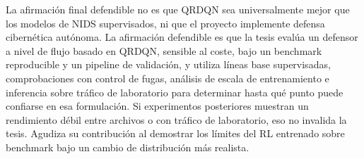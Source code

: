 La afirmación final defendible no es que QRDQN sea universalmente mejor que los modelos de NIDS supervisados, ni que el proyecto implemente defensa cibernética autónoma. La afirmación defendible es que la tesis evalúa un defensor a nivel de flujo basado en QRDQN, sensible al coste, bajo un benchmark reproducible y un pipeline de validación, y utiliza líneas base supervisadas, comprobaciones con control de fugas, análisis de escala de entrenamiento e inferencia sobre tráfico de laboratorio para determinar hasta qué punto puede confiarse en esa formulación. Si experimentos posteriores muestran un rendimiento débil entre archivos o con tráfico de laboratorio, eso no invalida la tesis. Agudiza su contribución al demostrar los límites del RL entrenado sobre benchmark bajo un cambio de distribución más realista.
